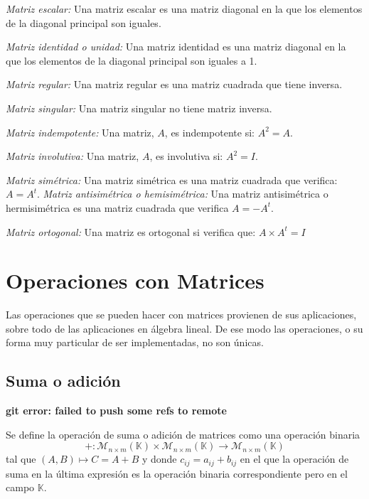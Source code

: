 \documentclass[10pt]{article}
\begin{document}
\begin{itemize}
\textit{Matriz escalar:} Una matriz  escalar es una matriz diagonal en la que los elementos de la diagonal principal son iguales.

\textit{Matriz identidad o unidad:} Una matriz  identidad es una matriz diagonal en la que los elementos de la diagonal principal son iguales a 1.

\textit{Matriz regular:} Una matriz  regular es una matriz cuadrada que tiene inversa.

\textit{Matriz singular:} Una matriz  singular no tiene matriz inversa.

\textit{Matriz indempotente:} Una matriz, $A$, es indempotente si: $A^2 = A$.

\textit{Matriz involutiva:} Una matriz, $A$, es involutiva si: $A^2 = I$.

\textit{Matriz simétrica:} Una matriz simétrica es una matriz cuadrada que verifica: $A = A^t$.
\textit{Matriz antisimétrica o hemisimétrica:} Una matriz antisimétrica o hermisimétrica es una matriz cuadrada que verifica $A = -A^t$.

\textit{Matriz ortogonal:} Una matriz es ortogonal si verifica que: $A\times {A^t} = I$

\end{itemize}

\section{Operaciones con Matrices}
Las operaciones que se pueden hacer con matrices provienen de sus aplicaciones, sobre todo de las aplicaciones en álgebra lineal. De ese modo las operaciones, o su forma muy particular de ser implementadas, no son únicas.

\subsection{Suma o adición}

\noindent \textbf{git error: failed to push some refs to remote}

Se define la operación de suma o adición de matrices como una operación binaria
$$
+ : \mathcal{M}_{n\times {m}}(\mathbb{K})\times {\mathcal{M}_{n\times {m}}(\mathbb{K})} \rightarrow \mathcal{M}_{n\times {m}}(\mathbb{K})
$$
tal que $(A, B) \longmapsto C = A+B$ y donde $c_{ij} = a_{ij} + b_{ij}$ en el que la operación de suma en la última expresión es la operación binaria correspondiente pero en el campo $\mathbb{K}$. \\
\end{document}
